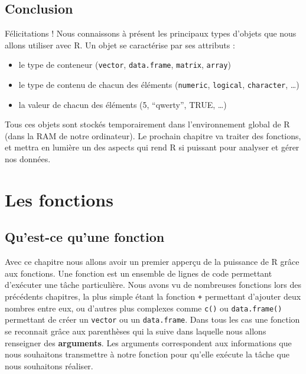 \documentclass[]{book}
\providecommand{\tightlist}{%
  \setlength{\itemsep}{0pt}\setlength{\parskip}{0pt}}
\theoremstyle{definition}
\theoremstyle{definition}
\theoremstyle{definition}
\theoremstyle{remark}
\begin{document}
\section{Conclusion}\label{conclusion-3}

Félicitations ! Nous connaissons à présent les principaux types d'objets
que nous allons utiliser avec R. Un objet se caractérise par ses
attributs :

\begin{itemize}
\tightlist
\item
  le type de conteneur (\texttt{vector}, \texttt{data.frame},
  \texttt{matrix}, \texttt{array})
\item
  le type de contenu de chacun des éléments (\texttt{numeric},
  \texttt{logical}, \texttt{character}, \ldots{})
\item
  la valeur de chacun des éléments (5, ``qwerty'', TRUE, \ldots{})
\end{itemize}

Tous ces objets sont stockés temporairement dans l'environnement global
de R (dans la RAM de notre ordinateur). Le prochain chapitre va traiter
des fonctions, et mettra en lumière un des aspects qui rend R si
puissant pour analyser et gérer nos données.

\chapter{Les fonctions}\label{fonctions}

\section{Qu'est-ce qu'une fonction}\label{quest-ce-quune-fonction}

Avec ce chapitre nous allons avoir un premier apperçu de la puissance de
R grâce aux fonctions. Une fonction est un ensemble de lignes de code
permettant d'exécuter une tâche particulière. Nous avons vu de
nombreuses fonctions lors des précédents chapitres, la plus simple étant
la fonction \texttt{+} permettant d'ajouter deux nombres entre eux, ou
d'autres plus complexes comme \texttt{c()} ou \texttt{data.frame()}
permettant de créer un \texttt{vector} ou un \texttt{data.frame}. Dans
tous les cas une fonction se reconnait grâce aux parenthèses qui la
suive dans laquelle nous allons renseigner des \textbf{arguments}. Les
arguments correspondent aux informations que nous souhaitons transmettre
à notre fonction pour qu'elle exécute la tâche que nous souhaitons
réaliser.
\end{document}
